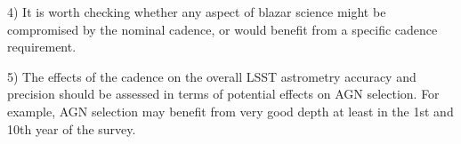 4) It is worth checking whether
any aspect of blazar science might be compromised by the nominal cadence, or
would benefit from a specific cadence requirement.

5) The effects of the cadence on the overall LSST astrometry accuracy and precision
should be assessed in terms of potential effects on AGN selection. For example,
AGN selection may benefit from very good depth at least in the 1st and 10th year of the
survey.


\navigationbar
